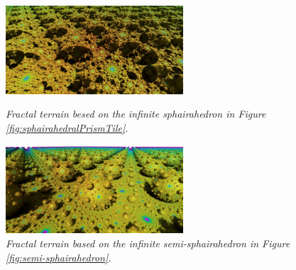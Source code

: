 \begin{figure}[h!tbp]
 \begin{minipage}[t]{0.5\textwidth}
 \centering
 \includegraphics[height=1.3in, keepaspectratio]{./img/application/sphairahedron/constructFractal/terrain.jpg}
 \caption{\textit{Fractal terrain besed on the infinite sphairahedron in Figure \ref{fig:sphairahedralPrismTile}.}}
 \label{fig:terrain}
 \end{minipage}
 \hspace*{\fill}
 \begin{minipage}[t]{0.5\textwidth}
 \centering
 \includegraphics[height=1.3in, keepaspectratio]{./img/application/sphairahedron/constructFractal/semi-terrain2.png}
 \caption{\textit{Fractal terrain based on the infinite semi-sphairahedron in
  Figure \ref{fig:semi-sphairahedron}.}}
 \label{fig:semi-terrain}
 \end{minipage}
 \hspace*{\fill}
\end{figure}

